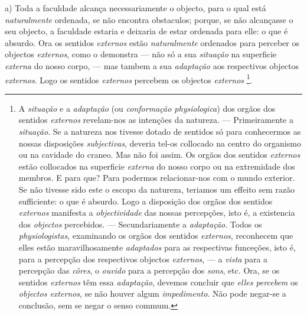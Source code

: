 a) Toda a faculdade alcança necessariamente o objecto, para o qual está \emph{naturalmente} ordenada, se não encontra obstaculos; porque, se não alcançasse o seu objecto, a faculdade estaria e deixaria de estar ordenada para elle: o que é absurdo. Ora os sentidos \emph{externos} estão \emph{naturalmente} ordenados para perceber os objectos \emph{externos}, como o demonstra --- não só a sua \emph{situação} na superficie \emph{externa} do nosso corpo, --- mas tambem a sua \emph{adaptação} aos respectivos objectos \emph{externos}. Logo os sentidos \emph{externos} percebem os objectos \emph{externos} \footnote{A \emph{situação} e a \emph{adaptação} (ou \emph{conformação physiologica}) dos orgãos dos sentidos \emph{externos} revelam-nos as intenções da natureza. --- Primeiramente a \emph{situação}. Se a natureza nos tivesse dotado de sentidos só para conhecermos as nossas disposições \emph{subjectivas}, deveria tel-os collocado na centro do organismo ou na cavidade do craneo. Mas não foi assim. Os orgãos dos sentidos \emph{externos} estão collocados na superficie \emph{externa} do nosso corpo ou na extremidade dos membros. E para que? Para podermos relacionar-nos com o mundo exterior. Se não tivesse sido este o escopo da natureza, teriamos um effeito sem razão sufficiente: o que é absurdo. Logo a disposição dos orgãos dos sentidos \emph{externos} manifesta a \emph{objectividade} das nossas percepções, isto é, a existencia dos \emph{objectos} percebidos. --- Secundariamente a \emph{adaptação}. Todos os \emph{physiologistas}, examinando os orgãos dos sentidos \emph{externos}, reconhecem que elles estão maravilhosamente \emph{adaptados} para as respectivas funceções, isto é, para a percepção dos respectivos objectos \emph{externos}, --- a \emph{vista} para a percepção das \emph{côres}, o \emph{ouvido} para a percepção dos \emph{sons}, etc. Ora, se os sentidos \emph{externos} têm essa \emph{adaptação}, devemos concluir que \emph{elles percebem} os \emph{objectos externos}, se não houver algum \emph{impedimento}. Não pode negar-se a conclusão, sem se negar o senso commum.}.

